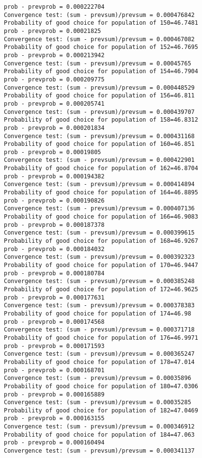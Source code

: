 \documentclass[11pt,onecolumn]{article}
\begin{document}
\begin{verbatim}
prob - prevprob = 0.000222704
Convergence test: (sum - prevsum)/prevsum = 0.000476842
Probability of good choice for population of 150=46.7481
prob - prevprob = 0.00021825
Convergence test: (sum - prevsum)/prevsum = 0.000467082
Probability of good choice for population of 152=46.7695
prob - prevprob = 0.000213942
Convergence test: (sum - prevsum)/prevsum = 0.00045765
Probability of good choice for population of 154=46.7904
prob - prevprob = 0.000209775
Convergence test: (sum - prevsum)/prevsum = 0.000448529
Probability of good choice for population of 156=46.811
prob - prevprob = 0.000205741
Convergence test: (sum - prevsum)/prevsum = 0.000439707
Probability of good choice for population of 158=46.8312
prob - prevprob = 0.000201834
Convergence test: (sum - prevsum)/prevsum = 0.000431168
Probability of good choice for population of 160=46.851
prob - prevprob = 0.00019805
Convergence test: (sum - prevsum)/prevsum = 0.000422901
Probability of good choice for population of 162=46.8704
prob - prevprob = 0.000194382
Convergence test: (sum - prevsum)/prevsum = 0.000414894
Probability of good choice for population of 164=46.8895
prob - prevprob = 0.000190826
Convergence test: (sum - prevsum)/prevsum = 0.000407136
Probability of good choice for population of 166=46.9083
prob - prevprob = 0.000187378
Convergence test: (sum - prevsum)/prevsum = 0.000399615
Probability of good choice for population of 168=46.9267
prob - prevprob = 0.000184032
Convergence test: (sum - prevsum)/prevsum = 0.000392323
Probability of good choice for population of 170=46.9447
prob - prevprob = 0.000180784
Convergence test: (sum - prevsum)/prevsum = 0.000385248
Probability of good choice for population of 172=46.9625
prob - prevprob = 0.000177631
Convergence test: (sum - prevsum)/prevsum = 0.000378383
Probability of good choice for population of 174=46.98
prob - prevprob = 0.000174568
Convergence test: (sum - prevsum)/prevsum = 0.000371718
Probability of good choice for population of 176=46.9971
prob - prevprob = 0.000171593
Convergence test: (sum - prevsum)/prevsum = 0.000365247
Probability of good choice for population of 178=47.014
prob - prevprob = 0.000168701
Convergence test: (sum - prevsum)/prevsum = 0.00035896
Probability of good choice for population of 180=47.0306
prob - prevprob = 0.000165889
Convergence test: (sum - prevsum)/prevsum = 0.00035285
Probability of good choice for population of 182=47.0469
prob - prevprob = 0.000163155
Convergence test: (sum - prevsum)/prevsum = 0.000346912
Probability of good choice for population of 184=47.063
prob - prevprob = 0.000160494
Convergence test: (sum - prevsum)/prevsum = 0.000341137

\end{verbatim}
\end{document}
